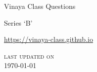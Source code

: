 \frontmatter

{\centering%

{\LARGE Vinaya Class Questions}

{\Large Series `B'}

\href{https://vinaya-class.github.io}{https://vinaya-class.github.io}

{\scshape\small last updated on}\\
\today

}


\tableofcontents*

\mainmatter








% 
% 
% 
% 
% 
% 
% 
% 
% 
% 
% 
% 
% 
% 
% 
% 
% 
% 
% 
